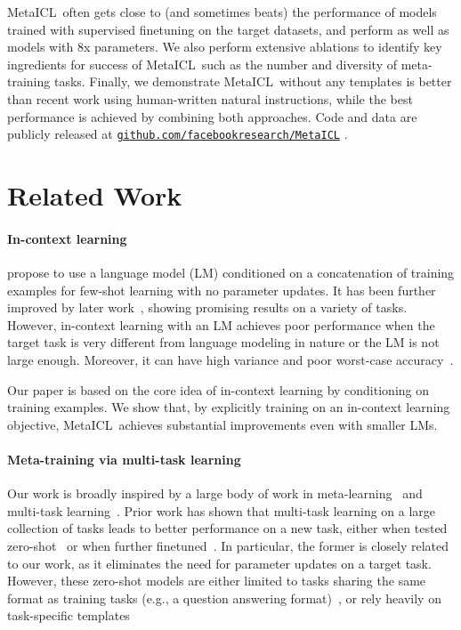 MetaICL\ often gets close to (and sometimes beats) the performance of models trained with supervised finetuning on the target datasets, and perform as well as models with 8x parameters. We also perform extensive ablations to identify key ingredients for success of MetaICL\ such as the number and diversity of meta-training tasks. Finally, we demonstrate MetaICL\ without any templates is better than recent work using human-written natural instructions, while the best performance is achieved by combining both approaches. Code and data are publicly released at 
    \href{https://github.com/facebookresearch/MetaICL}{\nolinkurl{github.com/facebookresearch/MetaICL}}
.

\section{Related Work}\label{sec:related}

\paragraph{In-context learning}

\citet{brown2020language} propose to use a language model (LM) conditioned on a concatenation of training examples for few-shot learning with no parameter updates. It has been further improved by later work~\citep{zhao2021calibrate, holtzman2021surface,min2022noisy}, showing promising results on a variety of tasks. However, in-context learning with an LM achieves poor performance when the target task is very different from language modeling in nature or the LM is not large enough. Moreover, it can have high variance and poor worst-case accuracy~\citep{perez2021true,lu2021fantastically}.

Our paper is based on the core idea of in-context learning by conditioning on training examples. We show that, by explicitly training on an in-context learning objective, MetaICL\ achieves substantial improvements even with smaller LMs. 

\paragraph{Meta-training via multi-task learning} Our work is broadly inspired by a large body of work in meta-learning~\citep{vilalta2002perspective,finn2017model} and multi-task learning~\citep{evgeniou2004regularized,ruder2017overview}. Prior work has shown that multi-task learning on a large collection of tasks leads to better performance on a new task, either when tested zero-shot~\citep{khashabi2020unifiedqa,zhong2021adapting,mishra2022cross,wei2022finetuned} or when further finetuned~\citep{aghajanyan2021muppet,ye2021crossfit}. In particular, the former is closely related to our work, as it eliminates the need for parameter updates on a target task. However, these zero-shot models are either limited to tasks sharing the same format as training tasks (e.g., a question answering format)~\citep{khashabi2020unifiedqa,zhong2021adapting}, or rely heavily on task-specific templates~\citep{mishra2022cross,wei2022finetuned,sanh2022multitask}

